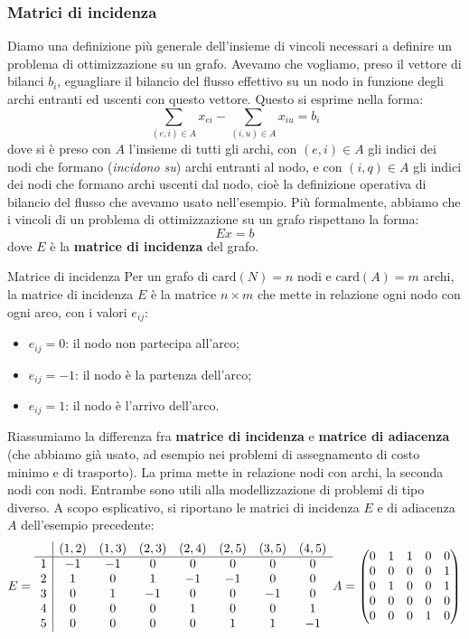 \documentclass[a4paper,11pt]{article}
\begin{document}
\subsubsection{Matrici di incidenza}
Diamo una definizione più generale dell'insieme di vincoli necessari a definire un problema di ottimizzazione su un grafo.
Avevamo che vogliamo, preso il vettore di bilanci $b_i$, eguagliare il bilancio del flusso effettivo su un nodo in funzione degli archi entranti ed uscenti con questo vettore.
Questo si esprime nella forma:
$$
\sum_{(e, i) \in A} x_{ei} - \sum_{(i,u) \in A} x_{iu} = b_i
$$
dove si è preso con $A$ l'insieme di tutti gli archi, con $(e,i) \in A$ gli indici dei nodi che formano (\textit{incidono su}) archi entranti al nodo, e con $(i,q) \in A$ gli indici dei nodi che formano archi uscenti dal nodo, cioè la definizione operativa di bilancio del flusso che avevamo usato nell'esempio.
Più formalmente, abbiamo che i vincoli di un problema di ottimizzazione su un grafo rispettano la forma:
$$
E x = b 
$$
dove $E$ è la \textbf{matrice di incidenza} del grafo.
\begin{definition}{Matrice di incidenza}
	Per un grafo di $\mathrm{card}(N) = n$ nodi e $\mathrm{card}(A) = m$ archi, la matrice di incidenza $E$ è la matrice $n \times m$ che mette in relazione ogni nodo con ogni arco, con i valori $e_{ij}$:
\begin{itemize}
	\item $e_{ij} = 0$: il nodo non partecipa all'arco;
	\item $e_{ij} = -1$: il nodo è la partenza dell'arco;
	\item $e_{ij} = 1$: il nodo è l'arrivo dell'arco.
\end{itemize}
\end{definition}

Riassumiamo la differenza fra \textbf{matrice di incidenza} e \textbf{matrice di adiacenza} (che abbiamo già usato, ad esempio nei problemi di assegnamento di costo minimo e di trasporto).
La prima mette in relazione nodi con archi, la seconda nodi con nodi.
Entrambe sono utili alla modellizzazione di problemi di tipo diverso.
A scopo esplicativo, si riportano le matrici di incidenza $E$ e di adiacenza $A$ dell'esempio precedente:
$$
E =
\begin{array}{c | c c c c c c c}
	& (1,2) & (1,3) & (2,3) & (2,4) & (2,5) & (3,5) & (4,5) \\
	\hline
	1 & -1 & -1 & 0 & 0 & 0 & 0 & 0 \\
	2 & 1 & 0 & 1 & -1 & -1 & 0 & 0 \\ 
	3 & 0 & 1 & -1 & 0 & 0 & -1 & 0 \\ 
	4 & 0 & 0 & 0 & 1 & 0 & 0 & 1 \\ 
	5 & 0 & 0 & 0 & 0 & 1 & 1 & -1 
\end{array}
A = 
\begin{pmatrix}
	0 & 1 & 1 & 0 & 0 \\ 
	0 & 0 & 0 & 0 & 1 \\ 
	0 & 1 & 0 & 0 & 1 \\ 
	0 & 0 & 0 & 0 & 0 \\ 
	0 & 0 & 0 & 1 & 0
\end{pmatrix}
$$
 
\end{document}
